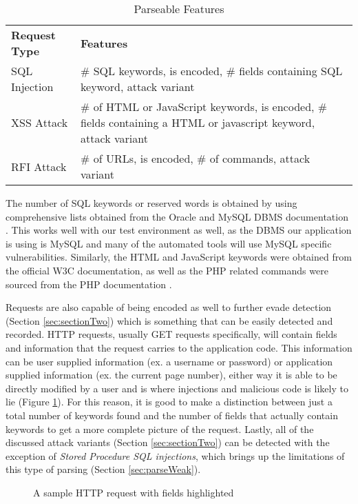 \begin{table}
	\centering
	\begin{tabular}{|p{1.5in}|p{4.5in}|}
	\hline
		\textbf{Request Type} & \textbf{Features}\\
	\hhline{|=|=|}
		SQL Injection & \# SQL keywords, is encoded, \# fields containing SQL keyword, attack variant\\
	\hline
		XSS Attack & \# of HTML or JavaScript keywords, is encoded, \# fields containing a HTML or javascript keyword, attack variant\\
	\hline
		RFI Attack & \# of URLs, is encoded, \# of commands, attack variant\\
	\hline
	\end{tabular}
	\caption{Parseable Features}
	\label{tab:features}
\end{table}

The number of SQL keywords or reserved words is obtained by using comprehensive lists obtained from the Oracle and MySQL DBMS documentation \cite{oracle}\cite{mysql}.  This works well with our test environment as well, as the DBMS our application is using is MySQL and many of the automated tools will use MySQL specific vulnerabilities.  Similarly, the HTML and JavaScript keywords were obtained from the official W3C documentation\cite{w3c1}\cite{w3c2}\cite{w3c3}, as well as the PHP related commands were sourced from the PHP documentation \cite{php}.

Requests are also capable of being encoded as well to further evade detection (Section \ref{sec:sectionTwo}) which is something that can be easily detected and recorded.  HTTP requests, usually GET requests specifically, will contain fields and information that the request carries to the application code.  This information can be user supplied information (ex. a username or password) or application supplied information (ex. the current page number), either way it is able to be directly modified by a user and is where injections and malicious code is likely to lie (Figure \ref{fig:sampleRequest}).  For this reason, it is good to make a distinction between just a total number of keywords found and the number of fields that actually contain keywords to get a more complete picture of the request.  Lastly, all of the discussed attack variants (Section \ref{sec:sectionTwo}) can be detected with the exception of \emph{Stored Procedure SQL injections}, which brings up the limitations of this type of parsing (Section \ref{sec:parseWeak}).

\begin{figure}
	\centering
	\caption{A sample HTTP request with fields highlighted}
	\label{fig:sampleRequest}
\end{figure}

